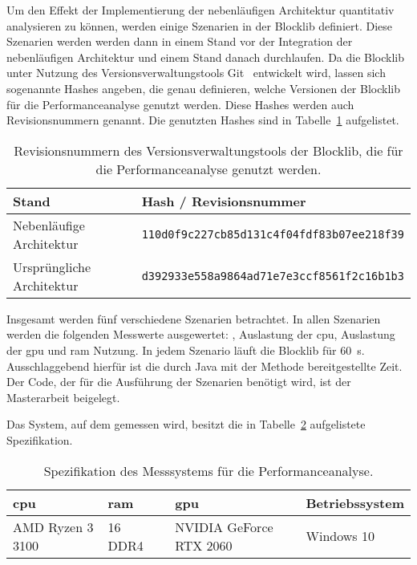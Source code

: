 Um den Effekt der Implementierung der nebenläufigen Architektur quantitativ analysieren zu können, werden einige Szenarien in der Blocklib definiert. Diese Szenarien werden werden dann in einem Stand vor der Integration der nebenläufigen Architektur und einem Stand danach durchlaufen. Da die Blocklib unter Nutzung des Versionsverwaltungstools Git~\cite{Chacon2014} entwickelt wird, lassen sich sogenannte Hashes angeben, die genau definieren, welche Versionen der Blocklib für die Performanceanalyse genutzt werden. Diese Hashes werden auch Revisionsnummern genannt. Die genutzten Hashes sind in Tabelle~\ref{tab:perfHash} aufgelistet.
\begin{table}
	\centering
	\begin{tabular}{ll}
		\toprule
		Stand & Hash / Revisionsnummer \\
		\midrule
		Nebenläufige Architektur & \texttt{110d0f9c227cb85d131c4f04fdf83b07ee218f39}\\
		Ursprüngliche Architektur & \texttt{d392933e558a9864ad71e7e3ccf8561f2c16b1b3} \\
		\bottomrule
	\end{tabular}
	\caption{Revisionsnummern des Versionsverwaltungstools der Blocklib, die für die Performanceanalyse genutzt werden.}\label{tab:perfHash}
\end{table}

Insgesamt werden fünf verschiedene Szenarien betrachtet. In allen Szenarien werden die folgenden Messwerte ausgewertet: \si{\fps}, Auslastung der \acs{cpu}, Auslastung der \ac{gpu} und \ac{ram} Nutzung. In jedem Szenario läuft die Blocklib für \SI{60}{\second}. Ausschlaggebend hierfür ist die durch Java mit der Methode  bereitgestellte Zeit. Der Code, der für die Ausführung der Szenarien benötigt wird, ist der Masterarbeit beigelegt.

Das System, auf dem gemessen wird, besitzt die in Tabelle~\ref{tab:spec} aufgelistete Spezifikation.

\begin{table}[!h]
	\centering
	\begin{tabular}[]{llll}
		\ac{cpu} & \ac{ram} & \ac{gpu} & Betriebssystem\\
		\midrule
		AMD Ryzen 3 3100 & \SI{16}{\giga\byte} DDR4 & NVIDIA GeForce RTX 2060 & Windows 10
	\end{tabular}
	\caption{Spezifikation des Messsystems für die Performanceanalyse.}\label{tab:spec}
\end{table}


